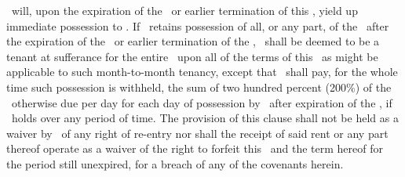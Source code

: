 \lessee\ will, upon the expiration of the \termoflease\ or earlier termination of this \amendmentTitle, yield up immediate possession to \lessor. If \lessee\ retains possession of all, or any part, of the \property\ after the expiration of the \termoflease\ or earlier termination of the \amendmentTitle, \lessee\ shall be deemed to be a tenant at sufferance for the entire \property\ upon all of the terms of this \amendmentTitle\ as might be applicable to such month-to-month tenancy, except that \lessee\ shall pay, for the whole time such possession is withheld, the sum of two hundred percent (200\%) of the \annualcashrent\ otherwise due per day for each day of possession by \lessee\ after expiration of the \termoflease, if \lessee\ holds over any period of time. The provision of this clause shall not be held as a waiver by \lessor\ of any right of re-entry nor shall the receipt of said rent or any part thereof operate as a waiver of the right to forfeit this \amendmentTitle\ and the term hereof for the period still unexpired, for a breach of any of the covenants herein.
